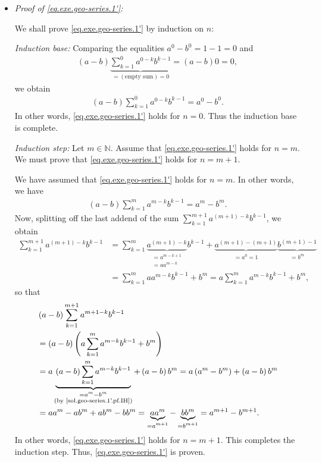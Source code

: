\documentclass[paper=a4, fontsize=12pt]{scrartcl} %
\newcommand{\NN}{\mathbb{N}} %
\newcommand{\tup}[1]{\left( #1 \right)}
\newcommand{\underbrack}[2]{\underbrace{#1}_{\substack{#2}}}
\let\sumnonlimits\sum
\renewcommand{\sum}{\sumnonlimits\limits}
\theoremstyle{plainsl}
\theoremstyle{definition}
\theoremstyle{remark}
\begin{document}
\begin{itemize}

\item \textit{Proof of \eqref{eq.exe.geo-series.1'}:}

We shall prove \eqref{eq.exe.geo-series.1'} by induction on $n$:

\textit{Induction base:}
Comparing the equalities $a^0 - b^0 = 1 - 1 = 0$ and
\begin{align*}
\tup{a-b}
\underbrace{\sum_{k = 1}^0 a^{0-k} b^{k-1}}_{=\tup{\text{empty sum}} = 0}
= \tup{a-b} 0 = 0,
\end{align*}
we obtain
\begin{align*}
\tup{a-b} \sum_{k = 1}^0 a^{0-k} b^{k-1}
= a^0 - b^0 .
\end{align*}
In other words, \eqref{eq.exe.geo-series.1'} holds for $n = 0$.
Thus the induction base is complete.

\textit{Induction step:}
Let $m \in \NN$.
Assume that \eqref{eq.exe.geo-series.1'} holds for $n = m$.
We must prove that \eqref{eq.exe.geo-series.1'} holds for $n = m+1$.

We have assumed that \eqref{eq.exe.geo-series.1'}
holds for $n = m$. In other words, we have
\begin{align}
\tup{a-b} \sum_{k = 1}^m a^{m-k} b^{k-1} = a^m - b^m .
\label{sol.geo-series.1'.pf.IH}
\end{align}
Now, splitting off the last addend of the sum
$\sum_{k = 1}^{m+1} a^{\tup{m+1}-k} b^{k-1}$, we obtain
\begin{align*}
  \sum_{k = 1}^{m+1} a^{\tup{m+1}-k} b^{k-1}
& = \sum_{k = 1}^m \underbrack{a^{\tup{m+1}-k}}{= a^{m-k+1} \\ = a a^{m-k}} b^{k-1}
      + \underbrack{a^{\tup{m+1}-\tup{m+1}}}{= a^0 = 1}
        \underbrack{b^{\tup{m+1}-1}}{= b^m} \\
& = \sum_{k = 1}^m a a^{m-k} b^{k-1} + b^m
  = a \sum_{k = 1}^m a^{m-k} b^{k-1} + b^m ,
\end{align*}
so that
\begin{align*}
& \tup{a-b} \sum_{k = 1}^{m+1} a^{{m+1}-k} b^{k-1} \\
& = \tup{a-b} \tup{a \sum_{k = 1}^m a^{m-k} b^{k-1} + b^m} \\
& = a \underbrack{\tup{a-b} \sum_{k = 1}^m a^{m-k} b^{k-1}}{= a^m - b^m \\ \text{(by \eqref{sol.geo-series.1'.pf.IH})}}
    + \tup{a-b} b^m
  = a \tup{a^m - b^m} + \tup{a-b} b^m \\
& = a a^m - a b^m + a b^m - b b^m
  = \underbrack{a a^m}{= a^{m+1}} - \underbrack{b b^m}{= b^{m+1}}
  = a^{m+1} - b^{m+1} .
\end{align*}
In other words, \eqref{eq.exe.geo-series.1'} holds for $n = m+1$.
This completes the induction step.
Thus, \eqref{eq.exe.geo-series.1'} is proven.


\end{itemize}
\end{document}
